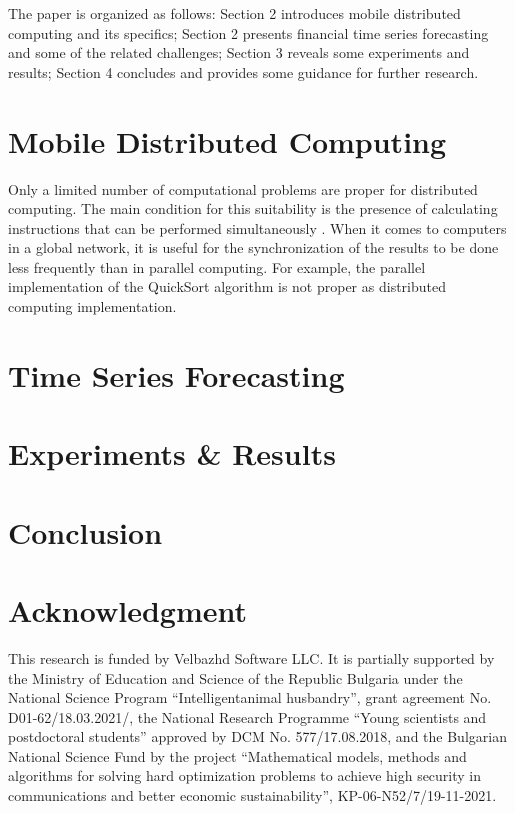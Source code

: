\documentclass[conference]{IEEEtran}
\begin{document}
The paper is organized as follows: Section 2 introduces mobile distributed computing and its specifics; Section 2 presents financial time series forecasting and some of the related challenges; Section 3 reveals some experiments and results; Section 4 concludes and provides some guidance for further research.

\section{Mobile Distributed Computing}

Only a limited number of computational problems are proper for distributed computing. The main condition for this suitability is the presence of calculating instructions that can be performed simultaneously \cite{Hillis-1986-a}. When it comes to computers in a global network, it is useful for the synchronization of the results to be done less frequently than in parallel computing. For example, the parallel implementation of the QuickSort \cite{Sanders-1997-a} algorithm is not proper as distributed computing implementation. 

\section{Time Series Forecasting}

\section{Experiments \& Results}

\section{Conclusion}

\section*{Acknowledgment}

This research is funded by Velbazhd Software LLC. It is partially supported by the Ministry of Education and Science of the Republic Bulgaria under the National Science Program “Intelligentanimal husbandry”, grant agreement No. D01-62/18.03.2021/, the National Research Programme “Young scientists and postdoctoral students” approved by DCM No. 577/17.08.2018, and the Bulgarian National Science Fund by the project “Mathematical models, methods and algorithms for solving hard optimization problems to achieve high security in communications and better economic sustainability”, KP-06-N52/7/19-11-2021.


\end{document}
